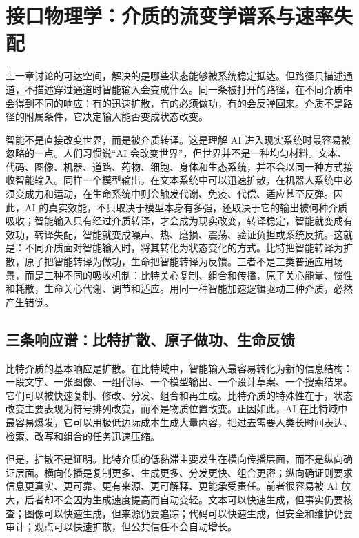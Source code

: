 \section{接口物理学：介质的流变学谱系与速率失配}

上一章讨论的可达空间，解决的是哪些状态能够被系统稳定抵达。但路径只描述通道，不描述穿过通道时智能输入会变成什么。同一条被打开的路径，在不同介质中会得到不同的响应：有的迅速扩散，有的必须做功，有的会反弹回来。介质不是路径的附属条件，它决定输入能否变成状态改变。

智能不是直接改变世界，而是被介质转译。这是理解 AI 进入现实系统时最容易被忽略的一点。人们习惯说“AI 会改变世界”，但世界并不是一种均匀材料。文本、代码、图像、机器、道路、药物、细胞、身体和生态系统，并不会以同一种方式接收智能输入。同样一个模型输出，在文本系统中可以迅速扩散，在机器人系统中必须变成力和运动，在生命系统中则会触发代谢、免疫、代偿、适应甚至反弹。因此，AI 的真实效能，不只取决于模型本身有多强，还取决于它的输出被何种介质吸收；智能输入只有经过介质转译，才会成为现实改变，转译稳定，智能就变成有效功，转译失配，智能就变成噪声、热、磨损、震荡、验证负担或系统反抗。这就是：不同介质面对智能输入时，将其转化为状态变化的方式。比特把智能转译为扩散，原子把智能转译为做功，生命把智能转译为反馈。三者不是三类普通应用场景，而是三种不同的吸收机制：比特关心复制、组合和传播，原子关心能量、惯性和耗散，生命关心代谢、调节和适应。用同一种智能加速逻辑驱动三种介质，必然产生错觉。

\subsection{三条响应谱：比特扩散、原子做功、生命反馈}


比特介质的基本响应是扩散。在比特域中，智能输入最容易转化为新的信息结构：一段文字、一张图像、一组代码、一个模型输出、一个设计草案、一个搜索结果。它们可以被快速复制、修改、分发、组合和再生成。比特介质的特殊性在于，状态改变主要表现为符号排列改变，而不是物质位置改变。正因如此，AI 在比特域中最容易爆发，它可以用极低边际成本生成大量内容，把过去需要人类长时间表达、检索、改写和组合的任务迅速压缩。

但是，扩散不是证明。比特介质的低黏滞主要发生在横向传播层面，而不是纵向确证层面。横向传播是复制更多、生成更多、分发更快、组合更密；纵向确证则要求信息更真实、更可靠、更有来源、更可解释、更能承受责任。前者很容易被 AI 放大，后者却不会因为生成速度提高而自动变轻。文本可以快速生成，但事实仍要核查；图像可以快速生成，但来源仍要追踪；代码可以快速生成，但安全和维护仍要审计；观点可以快速扩散，但公共信任不会自动增长。

